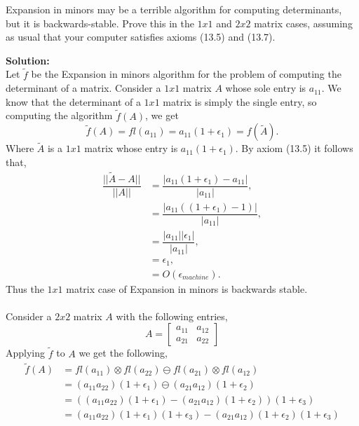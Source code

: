 \documentclass[12pt]{article}
\makeatletter
\theoremstyle{homework}
\newenvironment{exercise}[1]
{\def\@currentlabel{#1}\exercisecore}
{\endexercisecore}
\newcommand{\localhead}[1]{\par\smallskip\noindent\textbf{#1}\nobreak\\}%
\newcommand\solution{\localhead{Solution:}}
\makeatother
\begin{document}
\begin{exercise}{F4} Expansion in minors may be a terrible algorithm for computing determinants, but it is backwards-stable. Prove this in the $1x1$ and $2x2$ 
  matrix cases, assuming as usual that your computer satisfies axioms (13.5) and (13.7).\\
  \solution Let $\tilde{f}$ be the Expansion in minors algorithm for the problem of computing the determinant of a matrix. Consider a $1x1$ matrix $A$ whose sole entry is $a_{11}$.
  We know that the determinant of a $1x1$ matrix is simply the single entry, so computing the algorithm $\tilde{f}(A)$, we get 
  \begin{equation*}
    \tilde{f}(A) = fl(a_{11}) = a_{11}(1 + \epsilon_1)= f(\tilde{A}).
  \end{equation*}
  Where $\tilde{A}$ is a $1x1$ matrix whose entry is $a_{11}(1 + \epsilon_1)$. By axiom (13.5) it follows that, 
  \begin{align*}
    \dfrac{||\tilde{A} - A||}{||A||} &= \dfrac{|a_{11}(1 + \epsilon_1) - a_{11}|}{|a_{11}|},\\
    &= \dfrac{|a_{11}((1 + \epsilon_1) - 1)|}{|a_{11}|},\\
    &= \dfrac{|a_{11}||\epsilon_1|}{|a_{11}|},\\
    &= \epsilon_1,\\
    &= O(\epsilon_{machine}).
  \end{align*}
  Thus the $1x1$ matrix case of Expansion in minors is backwards stable. \\\\
  Consider a $2x2$ matrix $A$ with the following entries,
  \begin{equation*}
    A  = \begin{bmatrix}
      a_{11} & a_{12}\\
      a_{21} & a_{22}
    \end{bmatrix}
  \end{equation*}
  Applying $\tilde{f}$ to $A$ we get the following, 
  \begin{align*}
    \tilde{f}(A) &= fl(a_{11})\otimes fl(a_{22}) \ominus fl(a_{21})\otimes fl(a_{12})\\
    &= (a_{11} a_{22})(1 + \epsilon_1) \ominus (a_{21} a_{12})(1 + \epsilon_2) \\
    &= ((a_{11} a_{22})(1 + \epsilon_1) - (a_{21} a_{12})(1 + \epsilon_2))(1 + \epsilon_3)\\
    &= (a_{11} a_{22})(1 + \epsilon_1)(1 + \epsilon_3) - (a_{21} a_{12})(1 + \epsilon_2)(1 + \epsilon_3)\\

\end{align*}
\end{exercise}
\end{document}
